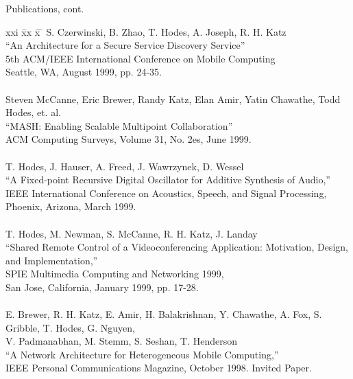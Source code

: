 \newpage
\begin{bf} \large
Publications, cont.
\end{bf}
\begin{tabbing}
xxi \= xx \= x \= \kill
\>    S. Czerwinski, B. Zhao, T. Hodes, A. Joseph, R. H. Katz \\
\>\>      ``An Architecture for a Secure Service Discovery Service'' \\
\>\>       5th ACM/IEEE International Conference on Mobile Computing \\
\>\>       Seattle, WA, August 1999, pp. 24-35. \\
\smallskip \\[-3pt]
\>    Steven McCanne, Eric Brewer, Randy Katz, Elan Amir, Yatin Chawathe,
    Todd Hodes, et. al. \\
\>\>      ``MASH: Enabling Scalable Multipoint Collaboration'' \\
\>\>       ACM Computing Surveys, Volume 31, No. 2es, June 1999. \\
\smallskip \\[-3pt]
\>    T. Hodes, J. Hauser, A. Freed, J. Wawrzynek, D. Wessel \\
\>\>      ``A Fixed-point Recursive Digital Oscillator for Additive Synthesis
        of Audio,'' \\
\>\>       IEEE International Conference on Acoustics, Speech, and Signal
            Processing,  \\
\>\>        Phoenix, Arizona, March 1999. \\
\smallskip \\[-3pt]
\>    T. Hodes, M. Newman, S. McCanne, R. H. Katz, J. Landay \\
\>\>      ``Shared Remote Control of a Videoconferencing Application: 
            Motivation, Design, and Implementation,'' \\
\>\>       SPIE Multimedia Computing and Networking 1999,  \\
\>\>        San Jose, California, January 1999, pp. 17-28. \\
\smallskip \\[-3pt]
\>    E. Brewer, R. H. Katz, E. Amir, H. Balakrishnan, Y. Chawathe, A. Fox,
    S. Gribble, T. Hodes, G. Nguyen, \\
\>\>\> V. Padmanabhan, M. Stemm, S. Seshan, T. Henderson \\
\>\>      ``A Network Architecture for Heterogeneous Mobile Computing,'' \\
\>\>       IEEE Personal Communications Magazine, October 1998. Invited Paper. \\

\end{tabbing}
